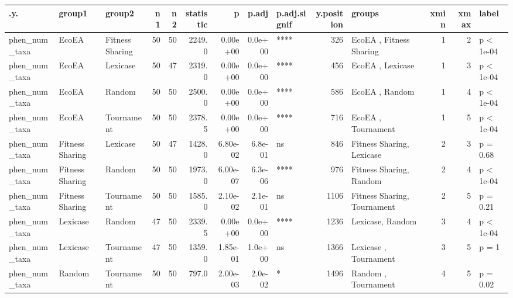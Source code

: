 \documentclass[]{book}
\begin{document}
\begin{table}
\centering
\begin{tabular}[t]{l|l|l|r|r|r|r|r|l|r|l|r|r|l}
\hline
.y. & group1 & group2 & n1 & n2 & statistic & p & p.adj & p.adj.signif & y.position & groups & xmin & xmax & label\\
\hline
phen\_num\_taxa & EcoEA & Fitness Sharing & 50 & 50 & 2249.0 & 0.00e+00 & 0.0e+00 & **** & 326 & EcoEA          , Fitness Sharing & 1 & 2 & p < 1e-04\\
\hline
phen\_num\_taxa & EcoEA & Lexicase & 50 & 47 & 2319.0 & 0.00e+00 & 0.0e+00 & **** & 456 & EcoEA   , Lexicase & 1 & 3 & p < 1e-04\\
\hline
phen\_num\_taxa & EcoEA & Random & 50 & 50 & 2500.0 & 0.00e+00 & 0.0e+00 & **** & 586 & EcoEA , Random & 1 & 4 & p < 1e-04\\
\hline
phen\_num\_taxa & EcoEA & Tournament & 50 & 50 & 2378.5 & 0.00e+00 & 0.0e+00 & **** & 716 & EcoEA     , Tournament & 1 & 5 & p < 1e-04\\
\hline
phen\_num\_taxa & Fitness Sharing & Lexicase & 50 & 47 & 1428.0 & 6.80e-02 & 6.8e-01 & ns & 846 & Fitness Sharing, Lexicase & 2 & 3 & p = 0.68\\
\hline
phen\_num\_taxa & Fitness Sharing & Random & 50 & 50 & 1973.0 & 6.00e-07 & 6.3e-06 & **** & 976 & Fitness Sharing, Random & 2 & 4 & p < 1e-04\\
\hline
phen\_num\_taxa & Fitness Sharing & Tournament & 50 & 50 & 1585.0 & 2.10e-02 & 2.1e-01 & ns & 1106 & Fitness Sharing, Tournament & 2 & 5 & p = 0.21\\
\hline
phen\_num\_taxa & Lexicase & Random & 47 & 50 & 2339.5 & 0.00e+00 & 0.0e+00 & **** & 1236 & Lexicase, Random & 3 & 4 & p < 1e-04\\
\hline
phen\_num\_taxa & Lexicase & Tournament & 47 & 50 & 1359.0 & 1.85e-01 & 1.0e+00 & ns & 1366 & Lexicase  , Tournament & 3 & 5 & p = 1\\
\hline
phen\_num\_taxa & Random & Tournament & 50 & 50 & 797.0 & 2.00e-03 & 2.0e-02 & * & 1496 & Random    , Tournament & 4 & 5 & p = 0.02\\
\hline
\end{tabular}
\end{table}
\end{document}
